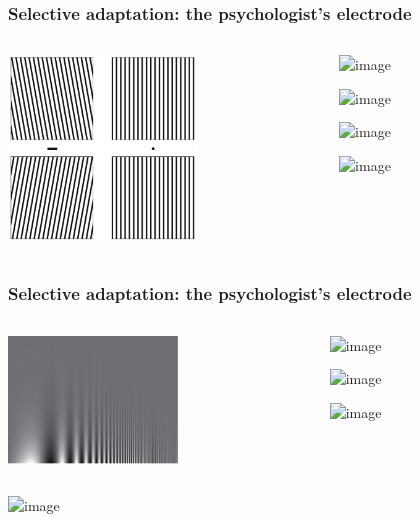 \documentclass[]{beamer}
\begin{document}
\begin{frame}
 \frametitle{Selective adaptation: the psychologist's electrode}
\begin{overlayarea}{110mm}{80mm}
\begin{columns}[T]
\begin{column}{50mm}
\includegraphics[width=50mm]{figs/l3/ori_tilt_aftereffect.png}
\end{column}
 
\begin{column}{60mm}
\includegraphics<1>[width=50mm]{figs/l3/ori_pre_adaptation_0.png}

\includegraphics<2->[width=50mm]{figs/l3/ori_pre_adaptation.png}

\includegraphics<1>[width=50mm]{figs/l3/ori_tuning.png}
 
\includegraphics<3>[width=50mm]{figs/l3/ori_post_adaptation.png}
\end{column}
\end{columns}
\end{overlayarea}
\end{frame}


\begin{frame}
 \frametitle{Selective adaptation: the psychologist's electrode}
\begin{overlayarea}{110mm}{80mm}
\begin{columns}[T]
\begin{column}{45mm}
\includegraphics[width=45mm]{figs/l3/sf_adaptation_test.png}
\end{column}
 
\begin{column}{45mm}
\includegraphics<1,4->[width=45mm]{figs/l3/sf_adaptation_vert.png}

\includegraphics<2>[width=45mm]{figs/l3/sf_adaptation_csf.png}

\includegraphics<3>[width=45mm]{figs/l3/sf_adaptation_hori.png}
\end{column}
\end{columns}

\begin{center}
\includegraphics<4>[width=110mm]{figs/l3/sf_adaptation.png}
\end{center}
\end{overlayarea}
\end{frame}
\end{document}
